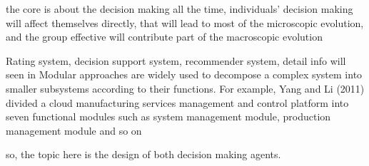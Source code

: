 the core is about the decision making all the time, individuals' decision making will affect themselves directly, that will lead to most of the microscopic evolution, and the group effective will contribute part of the macroscopic evolution 

Rating system, decision support system, recommender system,
detail info will seen in
Modular approaches are widely used to decompose a complex system into smaller subsystems according to their functions. For example, Yang and Li (2011) divided a cloud manufacturing services management and control platform into seven functional modules such as system management module, production management module and so on

so, the topic here is the design of both decision making agents.

